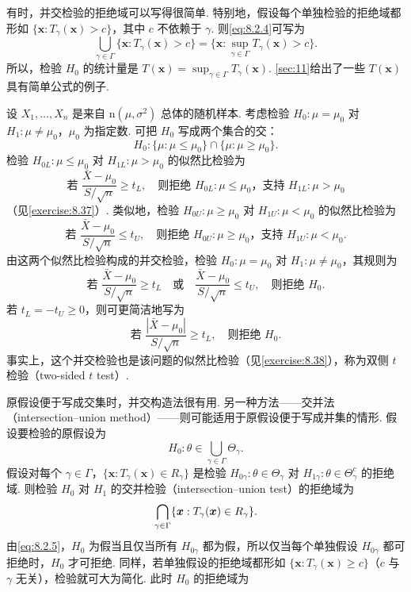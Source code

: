 有时，并交检验的拒绝域可以写得很简单. 特别地，假设每个单独检验的拒绝域都形如 $\{\boldsymbol x:T_\gamma(\boldsymbol x)>c\}$，其中 $c$ 不依赖于 $\gamma$. 则\eqref{eq:8.2.4}可写为
$$\bigcup_{\gamma\in\Gamma}\{\boldsymbol x:T_\gamma(\boldsymbol x)>c\}
=\{\boldsymbol x:\sup_{\gamma\in\Gamma}T_\gamma(\boldsymbol x)>c\}.$$
所以，检验 $H_0$ 的统计量是 $T(\boldsymbol x)=\sup_{\gamma\in\Gamma}T_\gamma(\boldsymbol x)$. \autoref{sec:11}给出了一些 $T(\boldsymbol x)$ 具有简单公式的例子.
\begin{example}[正态总体的并交检验]\label{ex:8.2.8}
设 $X_1,\ldots,X_n$ 是来自 $\mathrm n(\mu,\sigma^2)$ 总体的随机样本. 考虑检验 $H_0:\mu=\mu_0$ 对 $H_1:\mu\ne\mu_0$，$\mu_0$ 为指定数. 可把 $H_0$ 写成两个集合的交：
$$H_0:\{\mu:\mu\le\mu_0\}\cap\{\mu:\mu\ge\mu_0\}.$$
检验 $H_{0L}:\mu\le\mu_0$ 对 $H_{1L}:\mu>\mu_0$ 的似然比检验为
$$\text{若 }\frac{\bar X-\mu_0}{S/\sqrt n}\ge t_L,\quad\text{则拒绝 $H_{0L}:\mu\le\mu_0$，支持 $H_{1L}:\mu>\mu_0$}$$
（见\autoref{exercise:8.37}\mbox{）.} 类似地，检验 $H_{0U}:\mu\ge\mu_0$ 对 $H_{1U}:\mu<\mu_0$ 的似然比检验为
$$\text{若 }\frac{\bar X-\mu_0}{S/\sqrt n}\le t_U,\quad\text{则拒绝 $H_{0U}:\mu\ge\mu_0$，支持 $H_{1U}:\mu<\mu_0$}.$$
由这两个似然比检验构成的并交检验，检验 $H_0:\mu=\mu_0$ 对 $H_1:\mu\ne\mu_0$，其规则为
$$\text{若 }\frac{\bar X-\mu_0}{S/\sqrt n}\ge t_L\quad\text{或}\quad\frac{\bar X-\mu_0}{S/\sqrt n}\le t_U,\quad\text{则拒绝 }H_0.$$
若 $t_L=-t_U\ge0$，则可更简洁地写为
$$\text{若 }\frac{|\bar X-\mu_0|}{S/\sqrt n}\ge t_L,\quad\text{则拒绝 }H_0.$$
事实上，这个并交检验也是该问题的似然比检验（见\autoref{exercise:8.38}），称为双侧 $t$ 检验（two-sided $t$ test\mbox{）.}
\end{example}
原假设便于写成交集时，并交构造法很有用. 另一种方法——交并法（intersection–union method）——则可能适用于原假设便于写成并集的情形. 假设要检验的原假设为
\begin{equation}\label{eq:8.2.5}H_0:\theta\in\bigcup_{\gamma\in\Gamma}\Theta_\gamma.\end{equation}
假设对每个 $\gamma\in\Gamma$，$\{\boldsymbol x:T_\gamma(\boldsymbol x)\in R_\gamma\}$ 是检验 $H_{0\gamma}:\theta\in\Theta_\gamma$ 对 $H_{1\gamma}:\theta\in\Theta_\gamma^c$ 的拒绝域. 则检验 $H_0$ 对 $H_1$ 的交并检验（intersection–union test）的拒绝域为
\begin{equation}\label{eq:8.2.6}\index{SI0494@交并}\bigcap_{\gamma\in\Gamma}\{\boldsymbol x:T_\gamma(\boldsymbol x)\in R_\gamma\}.\end{equation}
由\eqref{eq:8.2.5}，$H_0$ 为假当且仅当所有 $H_{0\gamma}$ 都为假，所以仅当每个单独假设 $H_{0\gamma}$ 都可拒绝时，$H_0$ 才可拒绝. 同样，若单独假设的拒绝域都形如 $\{\boldsymbol x:T_\gamma(\boldsymbol x)\ge c\}$（$c$ 与 $\gamma$ 无关），检验就可大为简化. 此时 $H_0$ 的拒绝域为
